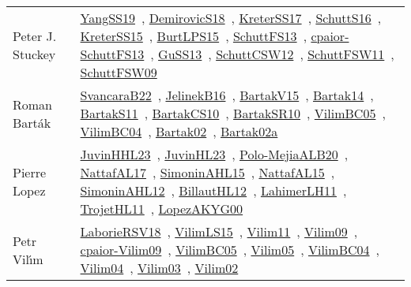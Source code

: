{\begin{longtable}{p{4cm}p{20cm}}
Peter J. Stuckey & \href{papers/YangSS19.pdf}{YangSS19}~\cite{YangSS19}, \href{papers/DemirovicS18.pdf}{DemirovicS18}~\cite{DemirovicS18}, \href{articles/KreterSS17.pdf}{KreterSS17}~\cite{KreterSS17}, \href{papers/SchuttS16.pdf}{SchuttS16}~\cite{SchuttS16}, \href{papers/KreterSS15.pdf}{KreterSS15}~\cite{KreterSS15}, \href{papers/BurtLPS15.pdf}{BurtLPS15}~\cite{BurtLPS15}, \href{papers/SchuttFS13.pdf}{SchuttFS13}~\cite{SchuttFS13}, \href{papers/cpaior-SchuttFS13.pdf}{cpaior-SchuttFS13}~\cite{cpaior-SchuttFS13}, \href{papers/GuSS13.pdf}{GuSS13}~\cite{GuSS13}, \href{papers/SchuttCSW12.pdf}{SchuttCSW12}~\cite{SchuttCSW12}, \href{articles/SchuttFSW11.pdf}{SchuttFSW11}~\cite{SchuttFSW11}, \href{papers/SchuttFSW09.pdf}{SchuttFSW09}~\cite{SchuttFSW09}\\
Roman Bart{\'{a}}k & \href{}{SvancaraB22}~\cite{SvancaraB22}, \href{papers/JelinekB16.pdf}{JelinekB16}~\cite{JelinekB16}, \href{}{BartakV15}~\cite{BartakV15}, \href{}{Bartak14}~\cite{Bartak14}, \href{articles/BartakS11.pdf}{BartakS11}~\cite{BartakS11}, \href{articles/BartakCS10.pdf}{BartakCS10}~\cite{BartakCS10}, \href{articles/BartakSR10.pdf}{BartakSR10}~\cite{BartakSR10}, \href{articles/VilimBC05.pdf}{VilimBC05}~\cite{VilimBC05}, \href{papers/VilimBC04.pdf}{VilimBC04}~\cite{VilimBC04}, \href{papers/Bartak02.pdf}{Bartak02}~\cite{Bartak02}, \href{papers/Bartak02a.pdf}{Bartak02a}~\cite{Bartak02a}\\
Pierre Lopez & \href{papers/JuvinHHL23.pdf}{JuvinHHL23}~\cite{JuvinHHL23}, \href{papers/JuvinHL23.pdf}{JuvinHL23}~\cite{JuvinHL23}, \href{}{Polo-MejiaALB20}~\cite{Polo-MejiaALB20}, \href{articles/NattafAL17.pdf}{NattafAL17}~\cite{NattafAL17}, \href{articles/SimoninAHL15.pdf}{SimoninAHL15}~\cite{SimoninAHL15}, \href{articles/NattafAL15.pdf}{NattafAL15}~\cite{NattafAL15}, \href{papers/SimoninAHL12.pdf}{SimoninAHL12}~\cite{SimoninAHL12}, \href{papers/BillautHL12.pdf}{BillautHL12}~\cite{BillautHL12}, \href{papers/LahimerLH11.pdf}{LahimerLH11}~\cite{LahimerLH11}, \href{articles/TrojetHL11.pdf}{TrojetHL11}~\cite{TrojetHL11}, \href{articles/LopezAKYG00.pdf}{LopezAKYG00}~\cite{LopezAKYG00}\\
Petr Vil{\'{\i}}m & \href{articles/LaborieRSV18.pdf}{LaborieRSV18}~\cite{LaborieRSV18}, \href{papers/VilimLS15.pdf}{VilimLS15}~\cite{VilimLS15}, \href{papers/Vilim11.pdf}{Vilim11}~\cite{Vilim11}, \href{papers/Vilim09.pdf}{Vilim09}~\cite{Vilim09}, \href{papers/cpaior-Vilim09.pdf}{cpaior-Vilim09}~\cite{cpaior-Vilim09}, \href{articles/VilimBC05.pdf}{VilimBC05}~\cite{VilimBC05}, \href{papers/Vilim05.pdf}{Vilim05}~\cite{Vilim05}, \href{papers/VilimBC04.pdf}{VilimBC04}~\cite{VilimBC04}, \href{papers/Vilim04.pdf}{Vilim04}~\cite{Vilim04}, \href{papers/Vilim03.pdf}{Vilim03}~\cite{Vilim03}, \href{papers/Vilim02.pdf}{Vilim02}~\cite{Vilim02}\\

\end{longtable}}
